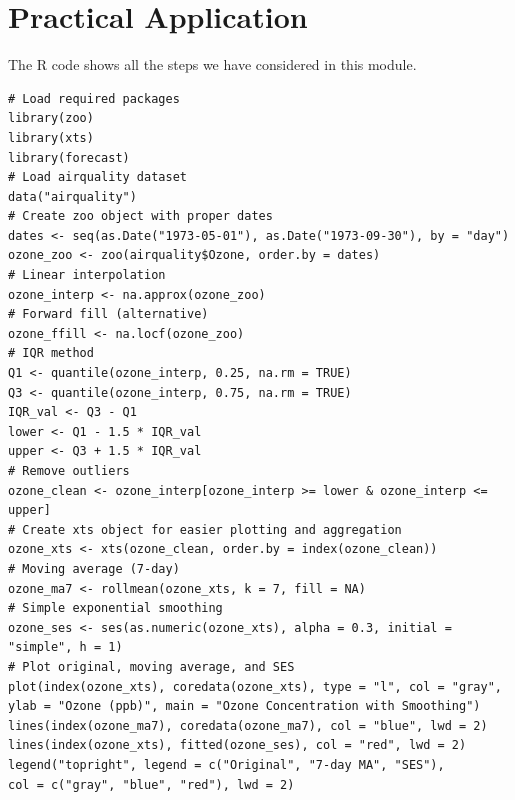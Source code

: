 \documentclass[12pt,a4paper]{article}
\begin{document}
\section{Practical Application}

The R code shows all the steps we have considered in this module.

\begin{verbatim}
# Load required packages
library(zoo)
library(xts)
library(forecast)
# Load airquality dataset
data("airquality")
# Create zoo object with proper dates
dates <- seq(as.Date("1973-05-01"), as.Date("1973-09-30"), by = "day")
ozone_zoo <- zoo(airquality$Ozone, order.by = dates)
# Linear interpolation
ozone_interp <- na.approx(ozone_zoo)
# Forward fill (alternative)
ozone_ffill <- na.locf(ozone_zoo)
# IQR method
Q1 <- quantile(ozone_interp, 0.25, na.rm = TRUE)
Q3 <- quantile(ozone_interp, 0.75, na.rm = TRUE)
IQR_val <- Q3 - Q1
lower <- Q1 - 1.5 * IQR_val
upper <- Q3 + 1.5 * IQR_val
# Remove outliers
ozone_clean <- ozone_interp[ozone_interp >= lower & ozone_interp <= upper]
# Create xts object for easier plotting and aggregation
ozone_xts <- xts(ozone_clean, order.by = index(ozone_clean))
# Moving average (7-day)
ozone_ma7 <- rollmean(ozone_xts, k = 7, fill = NA)
# Simple exponential smoothing
ozone_ses <- ses(as.numeric(ozone_xts), alpha = 0.3, initial = "simple", h = 1)
# Plot original, moving average, and SES
plot(index(ozone_xts), coredata(ozone_xts), type = "l", col = "gray",
ylab = "Ozone (ppb)", main = "Ozone Concentration with Smoothing")
lines(index(ozone_ma7), coredata(ozone_ma7), col = "blue", lwd = 2)
lines(index(ozone_xts), fitted(ozone_ses), col = "red", lwd = 2)
legend("topright", legend = c("Original", "7-day MA", "SES"),
col = c("gray", "blue", "red"), lwd = 2)
\end{verbatim}
\end{document}
